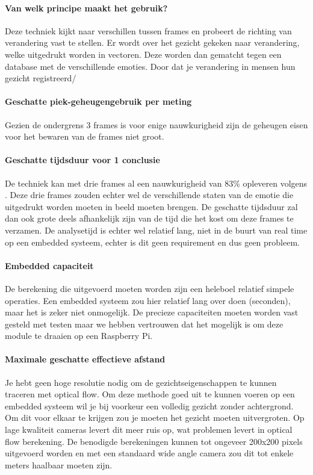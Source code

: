 \documentclass[11pt]{article}
\begin{document}
    \paragraph{Van welk principe maakt het gebruik?}
    Deze techniek kijkt naar verschillen tussen frames en probeert de richting van verandering vast te stellen.
    Er wordt over het gezicht gekeken naar verandering, welke uitgedrukt worden in vectoren.
    Deze worden dan gematcht tegen een database met de verschillende emoties.
    Door dat je verandering in mensen hun gezicht registreerd/

    \paragraph{Geschatte piek-geheugengebruik per meting}
    Gezien de ondergrens 3 frames is voor enige nauwkurigheid zijn de geheugen eisen voor het bewaren van de frames niet groot. 

    \paragraph{Geschatte tijdsduur voor 1 conclusie}
    De techniek kan met drie frames al een nauwkurigheid van 83\% opleveren volgens \emph{\citet{naghsh2006efficient}}.
    Deze drie frames zouden echter wel de verschillende staten van de emotie die uitgedrukt worden moeten in beeld moeten brengen.
    De geschatte tijdsduur zal dan ook grote deels afhankelijk zijn van de tijd die het kost om deze frames te verzamen.
    De analysetijd is echter wel relatief lang, niet in de buurt van real time op een embedded systeem, echter is dit geen requirement en dus geen probleem.

    \paragraph{Embedded capaciteit}
    De berekening die uitgevoerd moeten worden zijn een heleboel relatief simpele operaties.
    Een embedded systeem zou hier relatief lang over doen (seconden), maar het is zeker niet onmogelijk.
    De precieze capaciteiten moeten worden vast gesteld met testen maar we hebben vertrouwen dat het mogelijk is om deze module te draaien op een Raspberry Pi.

    \paragraph{Maximale geschatte effectieve afstand}
    Je hebt geen hoge resolutie nodig om de gezichtseigenschappen te kunnen traceren met optical flow.
    Om deze methode goed uit te kunnen voeren op een embedded systeem wil je bij voorkeur een volledig gezicht zonder achtergrond.
    Om dit voor elkaar te krijgen zou je moeten het gezicht moeten uitvergroten.
    Op lage kwaliteit cameras levert dit meer ruis op, wat problemen levert in optical flow berekening.
    De benodigde berekeningen kunnen tot ongeveer 200x200 pixels uitgevoerd worden en met een standaard wide angle camera zou dit tot enkele meters haalbaar moeten zijn.
\end{document}
